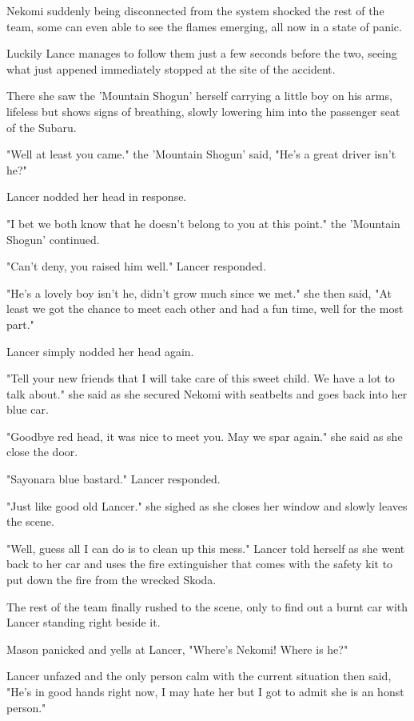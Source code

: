Nekomi suddenly being disconnected from the system shocked the rest of the team, some can even able to see the flames emerging, all now in a state of panic.

Luckily Lance manages to follow them just a few seconds before the two, seeing what just appened immediately stopped at the site of the accident.

There she saw the 'Mountain Shogun' herself carrying a little boy on his arms, lifeless but shows signs of breathing, slowly lowering him into the passenger seat of the Subaru.

"Well at least you came." the 'Mountain Shogun' said, "He's a great driver isn't he?"

Lancer nodded her head in response.

"I bet we both know that he doesn't belong to you at this point." the 'Mountain Shogun' continued.

"Can't deny, you raised him well." Lancer responded.

"He's a lovely boy isn't he, didn't grow much since we met." she then said, "At least we got the chance to meet each other and had a fun time, well for the most part."

Lancer simply nodded her head again.

"Tell your new friends that I will take care of this sweet child. We have a lot to talk about." she said as she secured Nekomi with seatbelts and goes back into her blue car.

"Goodbye red head, it was nice to meet you. May we spar again." she said as she close the door.

"Sayonara blue bastard." Lancer responded.

"Just like good old Lancer." she sighed as she closes her window and slowly leaves the scene.

"Well, guess all I can do is to clean up this mess." Lancer told herself as she went back to her car and uses the fire extinguisher that comes with the safety kit to put down the fire from the wrecked Skoda.

The rest of the team finally rushed to the scene, only to find out a burnt car with Lancer standing right beside it.

Mason panicked and yells at Lancer, "Where's Nekomi! Where is he?"

Lancer unfazed and the only person calm with the current situation then said, "He's in good hands right now, I may hate her but I got to admit she is an honst person."

